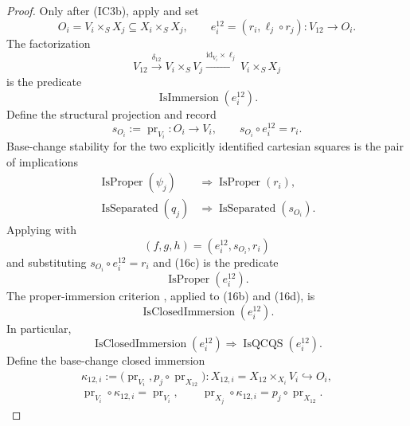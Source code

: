 \begin{proof}
  Only after (IC3b), apply  and set
  \[
    O_i=V_i\times_SX_j\subseteq X_i\times_SX_j,\qquad
    e_i^{12}=(r_i,\ell_j\circ r_j)\colon V_{12}\to O_i.
  \]
  The factorization
  \[
    V_{12}\xrightarrow{\delta_{12}}
      V_i\times_SV_j
      \xrightarrow{\mathrm{id}_{V_i}\times\ell_j}
      V_i\times_SX_j
  \]
  is the predicate
  \[
    \operatorname{IsImmersion}(e_i^{12}).                         \tag{16b}
  \]
  Define the structural projection and record
  \[
    s_{O_i}:=\operatorname{pr}_{V_i}\colon O_i\to V_i,
    \qquad s_{O_i}\circ e_i^{12}=r_i.
  \]
  Base-change stability for the two explicitly identified cartesian squares
  is the pair of implications
  \[
  \begin{aligned}
    \operatorname{IsProper}(\psi_j)
      &\Longrightarrow\operatorname{IsProper}(r_i),\\
    \operatorname{IsSeparated}(q_j)
      &\Longrightarrow\operatorname{IsSeparated}(s_{O_i}).
  \end{aligned}                                                   \tag{16c}
  \]
  Applying  with
  \[
    (f,g,h)=(e_i^{12},s_{O_i},r_i)
  \]
  and substituting $s_{O_i}\circ e_i^{12}=r_i$ and (16c) is the predicate
  \[
    \operatorname{IsProper}(e_i^{12}).                            \tag{16d}
  \]
  The proper-immersion criterion
  \cite[\href{https://stacks.math.columbia.edu/tag/01IQ}{Tag 01IQ}]
  {stacks-project}, applied to (16b) and (16d), is
  \[
    \operatorname{IsClosedImmersion}(e_i^{12}).                  \tag{16e}
  \]
  In particular,
  \[
    \operatorname{IsClosedImmersion}(e_i^{12})
      \Longrightarrow\operatorname{IsQCQS}(e_i^{12}).            \tag{16e0}
  \]
  Define the base-change closed immersion
  \[
  \begin{gathered}
    \kappa_{12,i}:=
      \bigl(\operatorname{pr}_{V_i},
        p_j\circ\operatorname{pr}_{X_{12}}\bigr)
      \colon X_{12,i}=X_{12}\times_{X_i}V_i\hookrightarrow O_i,\\
    \operatorname{pr}_{V_i}\circ\kappa_{12,i}
      =\operatorname{pr}_{V_i},\qquad
    \operatorname{pr}_{X_j}\circ\kappa_{12,i}
      =p_j\circ\operatorname{pr}_{X_{12}}.
  \end{gathered}                                                   \tag{16e1}
\]
\end{proof}
